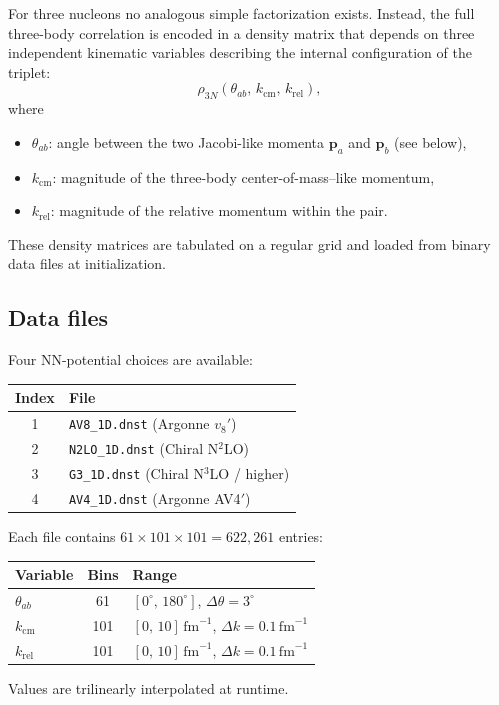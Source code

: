 \documentclass[11pt,a4paper]{article}
\newcommand{\vect}[1]{\bm{#1}}
\newcommand{\unit}[1]{\,\mathrm{#1}}
\newcommand{\fm}{\unit{fm}}
\begin{document}
For three nucleons no analogous simple factorization exists.  Instead, the
full three-body correlation is encoded in a density matrix that depends on
three independent kinematic variables describing the internal configuration
of the triplet:
\begin{equation}
  \rho_{3N}(\theta_{ab},\,k_{\text{cm}},\,k_{\text{rel}}),
\end{equation}
where
\begin{itemize}[nosep]
  \item $\theta_{ab}$: angle between the two Jacobi-like momenta
        $\vect{p}_{a}$ and $\vect{p}_{b}$ (see below),
  \item $k_{\text{cm}}$: magnitude of the three-body center-of-mass--like
        momentum,
  \item $k_{\text{rel}}$: magnitude of the relative momentum within the pair.
\end{itemize}

These density matrices are tabulated on a regular grid and loaded from
binary data files at initialization.

\subsection{Data files}

Four NN-potential choices are available:
\begin{center}
\begin{tabular}{cl}
\toprule
Index & File \\
\midrule
1 & \texttt{AV8\_1D.dnst}  (Argonne $v_8'$) \\
2 & \texttt{N2LO\_1D.dnst} (Chiral N$^{2}$LO) \\
3 & \texttt{G3\_1D.dnst}   (Chiral N$^{3}$LO / higher) \\
4 & \texttt{AV4\_1D.dnst}  (Argonne AV4$'$) \\
\bottomrule
\end{tabular}
\end{center}

Each file contains $61 \times 101 \times 101 = 622{,}261$ entries:
\begin{center}
\begin{tabular}{lcl}
\toprule
Variable & Bins & Range \\
\midrule
$\theta_{ab}$ & 61  & $[0^{\circ},\,180^{\circ}]$, $\Delta\theta = 3^{\circ}$ \\
$k_{\text{cm}}$  & 101 & $[0,\,10]\fm^{-1}$, $\Delta k = 0.1\fm^{-1}$ \\
$k_{\text{rel}}$ & 101 & $[0,\,10]\fm^{-1}$, $\Delta k = 0.1\fm^{-1}$ \\
\bottomrule
\end{tabular}
\end{center}
Values are trilinearly interpolated at runtime.
\end{document}
